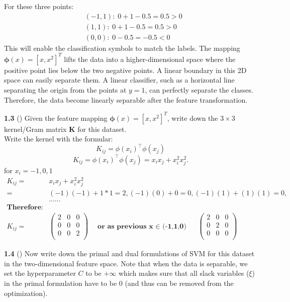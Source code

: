 For these three points:
\begin{align*}
&(-1,1) :  \; 0+ 1-0.5=0.5>0 \\
&(1,1) :  \;  0+ 1-0.5=0.5>0 \\
&(0,0) :  \;  0- 0.5= -0.5<0
\end{align*}
This will enable the classification symbols to match the labels. 
The mapping $\mathbf{\phi}(x) = [x, x^2]^T$ lifts the data into a higher-dimensional space where the positive point lies below the two negative points. A linear boundary in this 2D space can easily separate them. A linear classifier, such as a horizontal line separating the origin from the points at $y=1$, can perfectly separate the classes. Therefore, the data become linearly separable after the feature transformation.

\bigskip

\textbf{1.3} () Given the feature mapping $\mathbf{\phi}(x) = [x, x^2]^T$, write down the $3 \times 3$ kernel/Gram matrix $\mathbf{K}$ for this
dataset.\\

Write the kernel with the formular:
\[
K_{ij} = \phi(x_i)^\top \phi(x_j)
\]
\[
K_{ij}
=
\phi(x_i)^\top \phi(x_j)
=
x_i x_j + x_i^2 x_j^2.
\]
for $x_i = {-1, 0, 1}$
\begin{align*}
K_{ij} =& x_i x_j + x_i^2 x_j^2 \\
=& (-1)(-1) + 1*1= 2 , (-1) (0) + 0= 0, (-1)(1)+ (1)(1) = 0,\\
   & ......  \\
\textbf{Therefore:}\\
K_{ij} = 
&\begin{pmatrix}
2 & 0 & 0 \\
0 & 0 & 0 \\
0 & 0 & 2 \\
\end{pmatrix}
\quad \textbf{or as previous x $\in$ (-1,1,0) }
\quad \begin{pmatrix}
2 & 0 & 0 \\
0 & 2 & 0 \\
0 & 0 & 0 \\
\end{pmatrix}
\end{align*}

\bigskip

\textbf{1.4} () Now write down the primal and dual formulations of SVM for this dataset
in the two-dimensional feature space.
Note that when the data is separable, we set the hyperparameter $C$ to be $+\infty$
which makes sure that all slack variables ($\xi$) in the primal formulation have to be $0$
(and thus can be removed from the optimization).\\

